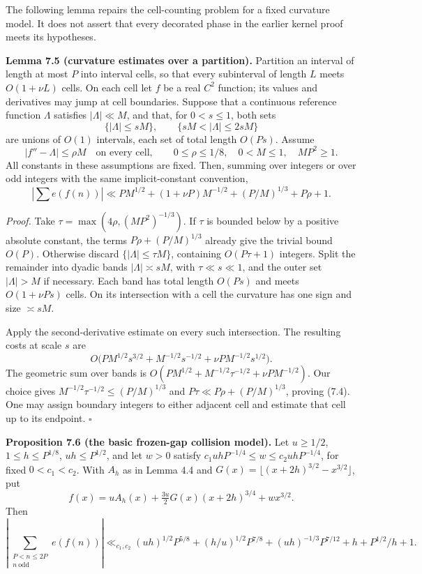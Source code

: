 \documentclass[11pt,a4paper]{article}
\begin{document}
The following lemma repairs the cell-counting problem for a fixed
curvature model. It does not assert that every decorated phase in the
earlier kernel proof meets its hypotheses.


\textbf{Lemma 7.5 (curvature estimates over a partition).} Partition an
interval of length at most \(P\) into interval cells, so that every
subinterval of length \(L\) meets \(O(1+\nu L)\) cells. On each cell let
\(f\) be a real \(C^2\) function; its values and derivatives may jump at
cell boundaries. Suppose that a continuous reference function
\(\Lambda\) satisfies \(|\Lambda|\ll M\), and that, for \(0<s\le1\),
both sets \[
\{|\Lambda|\le sM\},\qquad \{sM<|\Lambda|\le2sM\}
\] are unions of \(O(1)\) intervals, each set of total length \(O(Ps)\).
Assume \[
|f''-\Lambda|\le\rho M\quad\text{on every cell},\qquad
0\le\rho\le1/8,\quad 0<M\le1,\quad MP^2\ge1.
\] All constants in these assumptions are fixed. Then, summing over
integers or over odd integers with the same implicit-constant
convention, \[
\left|\sum e(f(n))\right|
\ll P M^{1/2}+(1+\nu P)M^{-1/2}
+(P/M)^{1/3}+P\rho+1.
\tag{7.4}
\]

\emph{Proof.} Take \(\tau=\max(4\rho,(MP^2)^{-1/3})\). If \(\tau\) is
bounded below by a positive absolute constant, the terms
\(P\rho+(P/M)^{1/3}\) already give the trivial bound \(O(P)\). Otherwise
discard \(\{|\Lambda|\le\tau M\}\), containing \(O(P\tau+1)\) integers.
Split the remainder into dyadic bands \(|\Lambda|\asymp sM\), with
\(\tau\ll s\ll1\), and the outer set \(|\Lambda|>M\) if necessary. Each
band has total length \(O(Ps)\) and meets \(O(1+\nu Ps)\) cells. On its
intersection with a cell the curvature has one sign and size
\(\asymp sM\).

Apply the second-derivative estimate on every such intersection. The
resulting costs at scale \(s\) are \[
O\bigl(PM^{1/2}s^{3/2}
+M^{-1/2}s^{-1/2}+\nu P M^{-1/2}s^{1/2}\bigr).
\] The geometric sum over bands is
\(O(PM^{1/2}+M^{-1/2}\tau^{-1/2}+\nu PM^{-1/2})\). Our choice gives
\(M^{-1/2}\tau^{-1/2}\le(P/M)^{1/3}\) and
\(P\tau\ll P\rho+(P/M)^{1/3}\), proving (7.4). One may assign boundary
integers to either adjacent cell and estimate that cell up to its
endpoint. \(\square\)


\textbf{Proposition 7.6 (the basic frozen-gap collision model).} Let
\(u\ge1/2\), \(1\le h\le P^{1/8}\), \(uh\le P^{1/2}\), and let \(w>0\)
satisfy \(c_1uhP^{-1/4}\le w\le c_2uhP^{-1/4}\), for fixed
\(0<c_1<c_2\). With \(A_h\) as in Lemma 4.4 and
\(G(x)=\lfloor(x+2h)^{3/2}-x^{3/2}\rfloor\), put \[
f(x)=uA_h(x)+\tfrac{3u}{2}G(x)(x+2h)^{3/4}+wx^{3/2}.
\] Then \[
\left|\sum_{\substack{P<n\le2P\\n\ \mathrm{odd}}}e(f(n))\right|
\ll_{c_1,c_2}
(uh)^{1/2}P^{5/8}+(h/u)^{1/2}P^{7/8}
+(uh)^{-1/3}P^{7/12}+h+P^{1/2}/h+1.
\tag{7.5}
\]
\end{document}
